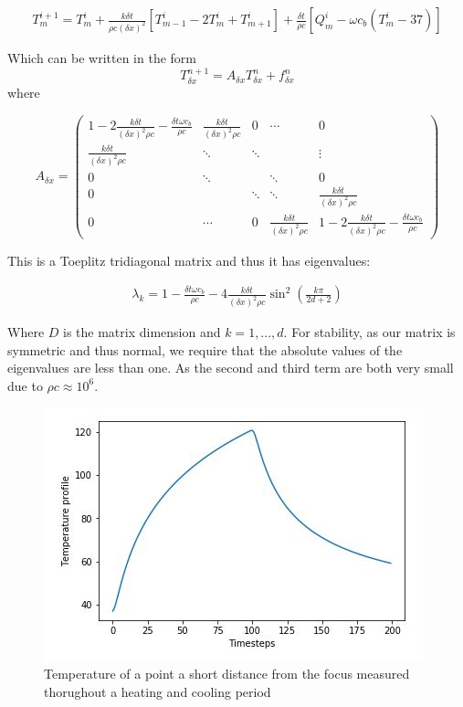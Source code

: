 \documentclass[11pt]{article} %
\begin{document}
\begin{eqnarray}
T^{i+1}_m=T^i_m+\frac{k\delta t}{\rho c (\delta x)^2}[T^i_{m-1}-2T^i_m+T^i_{m+1}]+\frac{\delta t}{\rho c}[Q^i_m-\omega c_b (T^i_m-37)]
\end{eqnarray} 

Which can be written in the form $$ T_{\delta x}^{n+1}=A_{\delta x}T_{\delta x}^{n}+f_{\delta x}^{n} $$
where 

$$ A_{\delta x}= \left( \begin{array}{ccccc}
1- 2\frac{k \delta t}{(\delta x)^2 \rho c} -\frac{\delta t \omega c_b}{\rho c }& \frac{k \delta t}{(\delta x)^2 \rho c} & 0 &\cdots  &0  \\ 
\frac{k \delta t}{(\delta x)^2 \rho c}& \ddots  & \ddots  &  & \vdots \\ 
0& \ddots  &  & \ddots  & 0 \\ 
0&  & \ddots  & \ddots  & \frac{k \delta t}{(\delta x)^2 \rho c} \\ 
0& \cdots &  0&\frac{k \delta t}{(\delta x)^2 \rho c}  & 1- 2\frac{k \delta t}{(\delta x)^2 \rho c} -\frac{\delta t \omega c_b}{\rho c }
\end{array}  \right)  $$

This is a  Toeplitz tridiagonal matrix and thus it has eigenvalues:

\begin{eqnarray}
\lambda_k = 1-\frac{\delta t \omega c_b}{\rho c}-4\frac{k \delta t}{(\delta x)^2 \rho c}\sin^2\left( \frac{k\pi}{2d+2}\right) 
\end{eqnarray}

Where $D$ is the matrix dimension and $k=1,...,d$. For stability, as our matrix is symmetric and thus normal, we require that the absolute values of the  eigenvalues are less than one. As the second and third term are both very small due to $\rho c \approx 10^6$. 


\begin{figure}
	\centering
	\includegraphics[width=0.7\linewidth]{Report_images/study_group_code_2D_model}
	\caption{Temperature of a point a short distance from the focus measured thorughout a heating and cooling period}
	\label{fig:studygroupcode2dmodel}
\end{figure}
\end{document}
